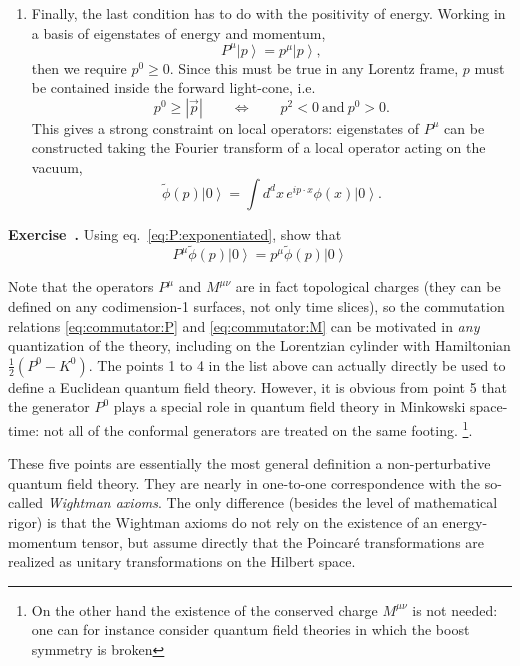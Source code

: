 \documentclass[a4paper,12pt]{article}
\newcommand{\ket}[1]{\left| #1 \right\rangle}
\numberwithin{equation}{section}
\newcounter{exercise}[section]
\newenvironment{exercise}[1][]%
	{\refstepcounter{exercise}\bigskip
	\begin{mdframed}[backgroundcolor=gray!20, linewidth=0]
	\noindent\textbf{Exercise~\thesection.\theexercise #1} \rmfamily}
  	{\end{mdframed}\bigskip}
\begin{document}
\begin{enumerate}
\item
Finally, the last condition has to do with the positivity of energy.
Working in a basis of eigenstates of energy and momentum, 
\begin{equation}
	P^\mu \ket{p} = p^\mu \ket{p},
\end{equation}
then we require $p^0 \geq 0$. Since this must be true in any Lorentz frame, $p$ must be contained inside the forward light-cone, i.e.
\begin{equation}
	p^0 \geq \left| \vec{p} \right|
	\qquad \Leftrightarrow \qquad
	p^2 < 0 ~\text{and}~ p^0 > 0.
	\label{eq:forwardcone}
\end{equation}
This gives a strong constraint on local operators: eigenstates of $P^\mu$ can be constructed taking the Fourier transform of a local operator acting on the vacuum,
\begin{equation}
	\widetilde{\phi}(p) \ket{0}
	= \int d^dx \, e^{i p \cdot x} \phi(x) \ket{0}.
	\label{eq:momentumspace}
\end{equation}

\end{enumerate}
%
\begin{exercise}
	Using eq.~\eqref{eq:P:exponentiated}, show that 
	$$ 
		P^\mu \widetilde{\phi}(p) \ket{0}
		= p^\mu \widetilde{\phi}(p) \ket{0} 
	$$
\end{exercise}
%
Note that the operators $P^\mu$ and $M^{\mu\nu}$ are in fact topological charges (they can be defined on any codimension-1 surfaces, not only time slices), so the commutation relations \eqref{eq:commutator:P} and \eqref{eq:commutator:M} can be motivated in \emph{any} quantization of the theory, including on the Lorentzian cylinder with Hamiltonian $\frac{1}{2}(P^0 - K^0)$.
The points 1 to 4 in the list above can actually directly be used to define a Euclidean quantum field theory.
However, it is obvious from point 5 that the generator $P^0$ plays a special role in quantum field theory in Minkowski space-time: not all of the conformal generators are treated on the same footing.%
%
\footnote{On the other hand the existence of the conserved charge $M^{\mu\nu}$ is not needed: one can for instance consider quantum field theories in which the boost symmetry is broken}.

These five points are essentially the most general definition a non-perturbative quantum field theory. They are nearly in one-to-one correspondence with the so-called \emph{Wightman axioms}. The only difference (besides the level of mathematical rigor) is that the Wightman axioms do not rely on the existence of an energy-momentum tensor, but assume directly that the Poincaré transformations are realized as unitary transformations on the Hilbert space.
\end{document}
